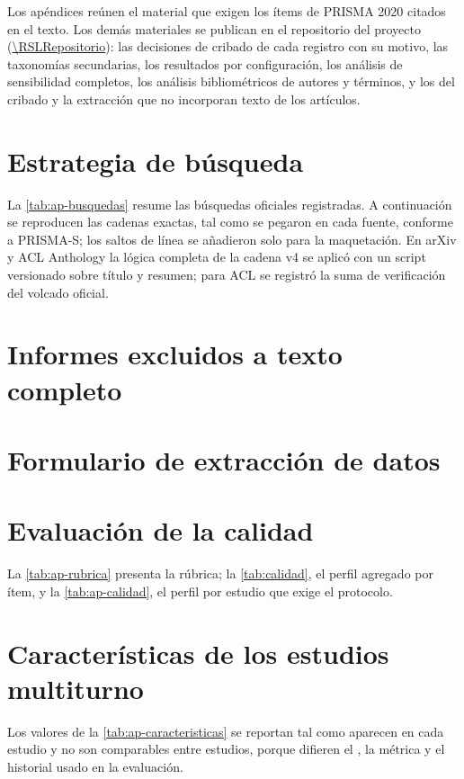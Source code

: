 Los apéndices reúnen el material que exigen los ítems de PRISMA 2020 citados en el texto. Los demás materiales se
publican en el repositorio del proyecto (\url{\RSLRepositorio}): las decisiones de cribado de cada registro con su motivo, las taxonomías
secundarias, los resultados por configuración, los análisis de sensibilidad completos, los análisis bibliométricos de
autores y términos, y los  del cribado y la extracción que no incorporan texto de los artículos.

\section{Estrategia de búsqueda}\label{app:busqueda}
La \cref{tab:ap-busquedas} resume las búsquedas oficiales registradas. A continuación se reproducen las cadenas exactas,
tal como se pegaron en cada fuente, conforme a PRISMA-S; los saltos de línea se añadieron solo para la maquetación. En arXiv y ACL Anthology la lógica completa de la cadena v4
se aplicó con un script versionado sobre título y resumen; para ACL se registró la suma de verificación del volcado
oficial.


\section{Informes excluidos a texto completo}\label{app:excluidos}


\section{Formulario de extracción de datos}\label{app:formulario}


\section{Evaluación de la calidad}\label{app:calidad}
La \cref{tab:ap-rubrica} presenta la rúbrica; la \cref{tab:calidad}, el perfil agregado por ítem, y la
\cref{tab:ap-calidad}, el perfil por estudio que exige el protocolo.


\section{Características de los estudios multiturno}\label{app:caracteristicas}
Los valores de la \cref{tab:ap-caracteristicas} se reportan tal como aparecen en cada estudio y no son comparables entre
estudios, porque difieren el , la métrica y el historial usado en la evaluación.


